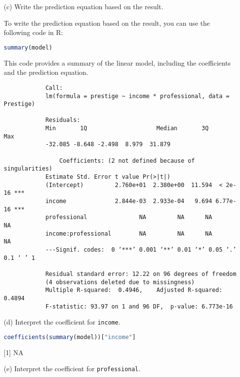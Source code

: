 \documentclass[12pt,letterpaper]{article}
\begin{document}
		\begin{enumerate}
	\item [(c)]
	Write the prediction equation based on the result.
	\vspace{0.05cm}
	
	\begin{enumerate}[(c)]
		To write the prediction equation based on the result, you can use the following code in R:
		
		\begin{lstlisting}[language=R]
			summary(model)
		\end{lstlisting}
		
		This code provides a summary of the linear model, including the coefficients and the prediction equation.
						
		\begin{verbatim}
			Call:
			lm(formula = prestige ~ income * professional, data = Prestige)
			
			Residuals:
			Min       1Q   					Median       3Q      Max  
			-32.085 -8.648 -2.498  8.979  31.879 
			
				Coefficients: (2 not defined because of singularities)
			Estimate Std. Error t value Pr(>|t|)    
			(Intercept)         2.760e+01  2.380e+00  11.594  < 2e-16 ***
			income              2.844e-03  2.933e-04   9.694 6.77e-16 ***
			professional               NA         NA      NA       NA    
			income:professional        NA         NA      NA       NA    
			---Signif. codes:  0 ‘***’ 0.001 ‘**’ 0.01 ‘*’ 0.05 ‘.’ 0.1 ‘ ’ 1
			
			Residual standard error: 12.22 on 96 degrees of freedom  
			(4 observations deleted due to missingness)
			Multiple R-squared:  0.4946,	Adjusted R-squared:  0.4894 
			F-statistic: 93.97 on 1 and 96 DF,  p-value: 6.773e-16
		\end{verbatim}
		
	\end{enumerate}

	\item [(d)]
	Interpret the coefficient for \texttt{income}.
	
	\vspace{0.05cm}	
			\begin{lstlisting}[language=R]
		coefficients(summary(model))["income"]
	\end{lstlisting}
	
	[1] NA
	
	\item [(e)]
	Interpret the coefficient for \texttt{professional}.
	

\end{enumerate}
\end{document}
